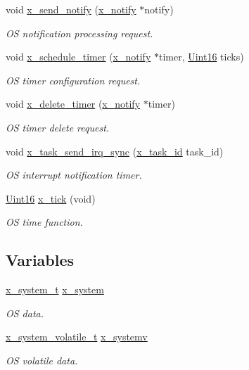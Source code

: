 \begin{DoxyCompactItemize}
void \hyperlink{a00037_ae17b0bb16da3c471bb6074bb4c4d0fee}{x\+\_\+send\+\_\+notify} (\hyperlink{a00036_df/d4c/a00851}{x\+\_\+notify} $\ast$notify)
\begin{DoxyCompactList}\small\item\em O\+S notification processing request. \end{DoxyCompactList}\item 
void \hyperlink{a00037_a9e3befaa21e83f196f74201deed85346}{x\+\_\+schedule\+\_\+timer} (\hyperlink{a00036_df/d4c/a00851}{x\+\_\+notify} $\ast$timer, \hyperlink{a00072_a59a9f6be4562c327cbfb4f7e8e18f08b}{Uint16} ticks)
\begin{DoxyCompactList}\small\item\em O\+S timer configuration request. \end{DoxyCompactList}\item 
void \hyperlink{a00037_ab69e9af4cfa717e870d587906283635c}{x\+\_\+delete\+\_\+timer} (\hyperlink{a00036_df/d4c/a00851}{x\+\_\+notify} $\ast$timer)
\begin{DoxyCompactList}\small\item\em O\+S timer delete request. \end{DoxyCompactList}\item 
void \hyperlink{a00037_a9953756bc7c83e5f2c36830396136e75}{x\+\_\+task\+\_\+send\+\_\+irq\+\_\+sync} (\hyperlink{a00036_ad5c3c5fbfd3e4aadf22830395484a71d}{x\+\_\+task\+\_\+id} task\+\_\+id)
\begin{DoxyCompactList}\small\item\em O\+S interrupt notification timer. \end{DoxyCompactList}\item 
\hyperlink{a00072_a59a9f6be4562c327cbfb4f7e8e18f08b}{Uint16} \hyperlink{a00037_acc618db6c04f9d2dce6d3b14b5294e51}{x\+\_\+tick} (void)
\begin{DoxyCompactList}\small\item\em O\+S time function. \end{DoxyCompactList}\end{DoxyCompactItemize}
\subsection*{Variables}
\begin{DoxyCompactItemize}
\item 
\hyperlink{a00037_da/d98/a00870}{x\+\_\+system\+\_\+t} \hyperlink{a00037_ae4d7967b507ca26e3ee1231215b03321}{x\+\_\+system}
\begin{DoxyCompactList}\small\item\em O\+S data. \end{DoxyCompactList}\item 
\hyperlink{a00037_dd/de1/a00871}{x\+\_\+system\+\_\+volatile\+\_\+t} \hyperlink{a00037_ad839c033d3d00cdcc6032038182be270}{x\+\_\+systemv}
\begin{DoxyCompactList}\small\item\em O\+S volatile data. \end{DoxyCompactList}\end{DoxyCompactItemize}


